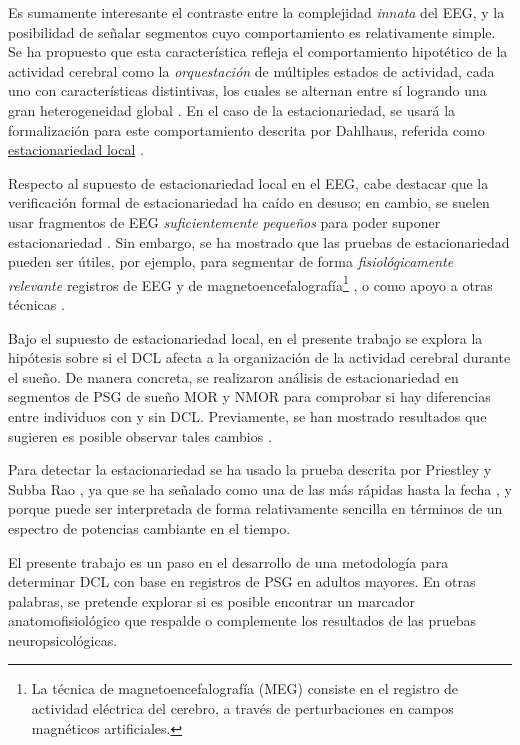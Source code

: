 \documentclass[12pt,letterpaper]{book}
\begin{document}
Es sumamente interesante el contraste entre la complejidad \textit{innata} del EEG, y la posibilidad de señalar segmentos cuyo comportamiento es relativamente simple.
%
Se ha propuesto que esta característica refleja el comportamiento hipotético de la actividad cerebral como la \textit{orquestación} de múltiples estados de actividad, cada uno con características distintivas, los cuales se alternan entre sí logrando una gran heterogeneidad global \cite{kaplan2000application}.
%
En el caso de la estacionariedad, se usará la formalización para este comportamiento descrita por Dahlhaus, referida como \underline{estacionariedad local} \cite{Dahlhaus97}.

Respecto al supuesto de estacionariedad local en el EEG, cabe destacar que la verificación formal de estacionariedad ha caído en desuso; en cambio, se suelen usar fragmentos de EEG \textit{suficientemente pequeños} para poder suponer estacionariedad \cite{Kaiser00}.
%
Sin embargo, se  ha mostrado que las pruebas de estacionariedad pueden ser útiles, por ejemplo, para segmentar de forma \textit{fisiológicamente relevante} registros de EEG \cite{Kaplan99} y de magnetoencefalografía\footnote{La técnica de magnetoencefalografía (MEG) consiste en el registro de actividad eléctrica del cerebro, a través de perturbaciones en campos magnéticos artificiales.} \cite{lazyref1}, o como apoyo a otras técnicas \cite{allegrini10}.

Bajo el supuesto de estacionariedad local, en el presente trabajo se explora la hipótesis sobre si el DCL afecta a la organización de la actividad cerebral durante el sueño.
%
De manera concreta, se realizaron análisis de estacionariedad en segmentos de PSG de sueño MOR y NMOR para comprobar si hay diferencias entre individuos con y sin DCL.
%
Previamente, se han mostrado resultados que sugieren es posible observar tales cambios
\cite{rosales2017stationarity}.

Para detectar la estacionariedad se ha usado la prueba descrita por Priestley y Subba Rao \cite{Priestley69}, ya que se ha señalado como una de las más rápidas hasta la fecha \cite{Nason13}, y porque puede ser interpretada de forma relativamente sencilla en términos de un espectro de potencias cambiante en el tiempo. 
%

El presente trabajo es un paso en el desarrollo de una metodología para determinar DCL con base en registros de PSG en adultos mayores. En otras palabras, se pretende explorar si es posible encontrar un marcador anatomofisiológico que respalde o complemente los resultados de las pruebas neuropsicológicas.
%
\end{document}
